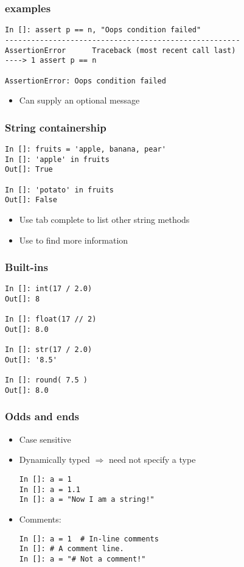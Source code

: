\documentclass[14pt,compress]{beamer}
\begin{document}
\begin{frame}[fragile]
  \frametitle{ examples}
  \begin{small}
\begin{lstlisting}
In []: assert p == n, "Oops condition failed"
------------------------------------------------------
AssertionError      Traceback (most recent call last)
----> 1 assert p == n

AssertionError: Oops condition failed
\end{lstlisting}
  \end{small}
  \begin{itemize}
  \item Can supply an optional message
  \end{itemize}
\end{frame}


\begin{frame}[fragile]
\frametitle{String containership}
  \begin{lstlisting}
In []: fruits = 'apple, banana, pear'
In []: 'apple' in fruits
Out[]: True

In []: 'potato' in fruits
Out[]: False

\end{lstlisting}
  \begin{itemize}
  \item Use tab complete to list other string methods
  \item Use  to find more information
  \end{itemize}

\end{frame}

\begin{frame}[fragile]
  \frametitle{Built-ins}
  \begin{lstlisting}
In []: int(17 / 2.0)
Out[]: 8

In []: float(17 // 2)
Out[]: 8.0

In []: str(17 / 2.0)
Out[]: '8.5'

In []: round( 7.5 )
Out[]: 8.0
  \end{lstlisting}
\end{frame}

\begin{frame}[fragile]
  \frametitle{Odds and ends}
  \begin{itemize}
    \item Case sensitive
    \item Dynamically typed $\Rightarrow$ need not specify a type
      \begin{lstlisting}
In []: a = 1
In []: a = 1.1
In []: a = "Now I am a string!"
      \end{lstlisting}
    \item Comments:
      \begin{lstlisting}
In []: a = 1  # In-line comments
In []: # A comment line.
In []: a = "# Not a comment!"
      \end{lstlisting}
  \end{itemize}
\end{frame}
\end{document}
